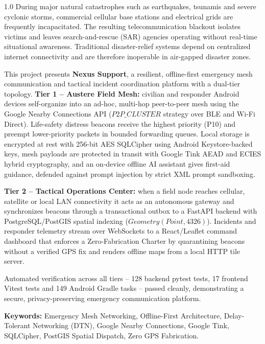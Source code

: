 \documentclass[12pt,a4paper]{report}
\begin{document}
\begin{spacing}{1.0}
During major natural catastrophes such as earthquakes, tsunamis and severe cyclonic storms, commercial cellular base stations and electrical grids are frequently incapacitated. The resulting telecommunication blackout isolates victims and leaves search-and-rescue (SAR) agencies operating without real-time situational awareness. Traditional disaster-relief systems depend on centralized internet connectivity and are therefore inoperable in air-gapped disaster zones.

This project presents \textbf{Nexus Support}, a resilient, offline-first emergency mesh communication and tactical incident coordination platform with a dual-tier topology. \textbf{Tier 1 -- Austere Field Mesh:} civilian and responder Android devices self-organize into an ad-hoc, multi-hop peer-to-peer mesh using the Google Nearby Connections API ($P2P\_CLUSTER$ strategy over BLE and Wi-Fi Direct). Life-safety distress beacons receive the highest priority (P10) and preempt lower-priority packets in bounded forwarding queues. Local storage is encrypted at rest with 256-bit AES SQLCipher using Android Keystore-backed keys, mesh payloads are protected in transit with Google Tink AEAD and ECIES hybrid cryptography, and an on-device offline AI assistant gives first-aid guidance, defended against prompt injection by strict XML prompt sandboxing.

\textbf{Tier 2 -- Tactical Operations Center:} when a field node reaches cellular, satellite or local LAN connectivity it acts as an autonomous gateway and synchronizes beacons through a transactional outbox to a FastAPI backend with PostgreSQL/PostGIS spatial indexing ($Geometry(Point, 4326)$). Incidents and responder telemetry stream over WebSockets to a React/Leaflet command dashboard that enforces a Zero-Fabrication Charter by quarantining beacons without a verified GPS fix and renders offline maps from a local HTTP tile server.

Automated verification across all tiers -- 128 backend pytest tests, 17 frontend Vitest tests and 149 Android Gradle tasks -- passed cleanly, demonstrating a secure, privacy-preserving emergency communication platform.
\end{spacing}

\vspace{0.4cm}
\noindent\textbf{Keywords:} Emergency Mesh Networking, Offline-First Architecture, Delay-Tolerant Networking (DTN), Google Nearby Connections, Google Tink, SQLCipher, PostGIS Spatial Dispatch, Zero GPS Fabrication.
\newpage
\end{document}
